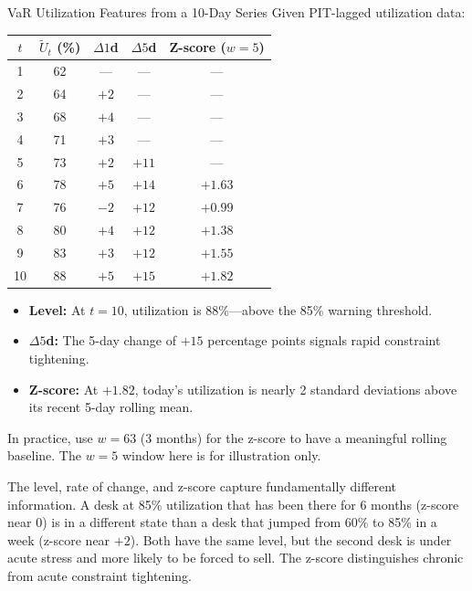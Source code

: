 \begin{workedexample}{VaR Utilization Features from a 10-Day Series}
Given PIT-lagged utilization data:

\begin{center}
\small
\begin{tabular}{@{}ccccc@{}}
\toprule
$t$ & $\tilde{U}_t$ (\%) & $\Delta 1$d & $\Delta 5$d &
  Z-score ($w\!=\!5$) \\
\midrule
1  & 62 & ---  & ---  & --- \\
2  & 64 & $+2$ & ---  & --- \\
3  & 68 & $+4$ & ---  & --- \\
4  & 71 & $+3$ & ---  & --- \\
5  & 73 & $+2$ & $+11$& --- \\
6  & 78 & $+5$ & $+14$& $+1.63$ \\
7  & 76 & $-2$ & $+12$& $+0.99$ \\
8  & 80 & $+4$ & $+12$& $+1.38$ \\
9  & 83 & $+3$ & $+12$& $+1.55$ \\
10 & 88 & $+5$ & $+15$& $+1.82$ \\
\bottomrule
\end{tabular}
\end{center}

\begin{itemize}[nosep]
  \item \textbf{Level:} At $t\!=\!10$, utilization is 88\%---above the
        85\% warning threshold.
  \item \textbf{$\Delta 5$d:} The 5-day change of $+15$ percentage
        points signals rapid constraint tightening.
  \item \textbf{Z-score:} At $+1.82$, today's utilization is nearly
        2 standard deviations above its recent 5-day rolling mean.
\end{itemize}
In practice, use $w=63$ (3 months) for the z-score to have a
meaningful rolling baseline.  The $w=5$ window here is for illustration
only.
\end{workedexample}

\begin{intuition}
The level, rate of change, and z-score capture fundamentally different
information.  A desk at 85\% utilization that has been there for 6
months (z-score near 0) is in a different state than a desk that jumped
from 60\% to 85\% in a week (z-score near $+2$).  Both have the same
level, but the second desk is under acute stress and more likely to
be forced to sell.  The z-score distinguishes chronic from acute
constraint tightening.
\end{intuition}


